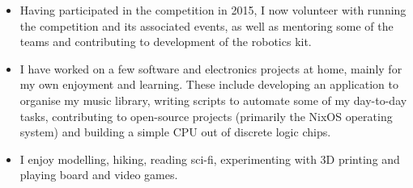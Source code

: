 
\begin{itemize}
  \item Having participated in the \studentrobotics{} competition in 2015, I now volunteer with running the competition and its associated events, as well as mentoring some of the teams and contributing to development of the robotics kit.
  \item I have worked on a few software and electronics projects at home, mainly for my own enjoyment and learning. These include developing an application to organise my music library, writing scripts to automate some of my day-to-day tasks, contributing to open-source projects (primarily the NixOS operating system) and building a simple CPU out of discrete logic chips.
  \item I enjoy modelling, hiking, reading sci-fi, experimenting with 3D printing and playing board and video games.
\end{itemize}

